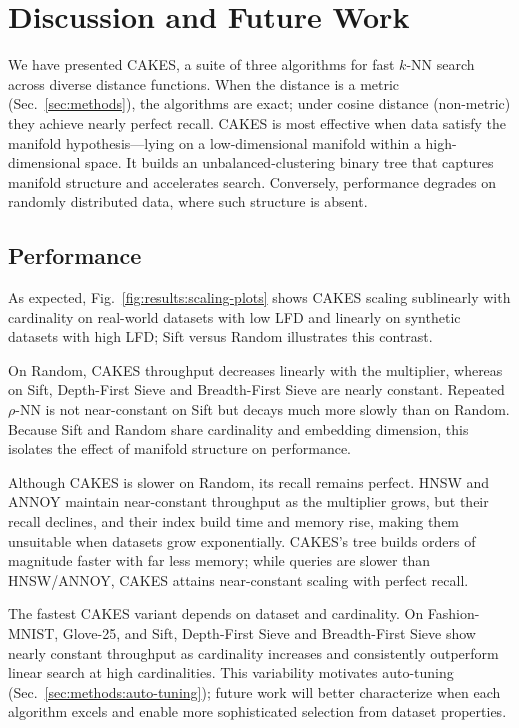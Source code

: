 \section{Discussion and Future Work}
\label{sec:discussion-and-future-work}

We have presented CAKES, a suite of three algorithms for fast $k$-NN search across diverse distance functions. When the distance is a metric (Sec.~\ref{sec:methods}), the algorithms are exact; under cosine distance (non-metric) they achieve nearly perfect recall. CAKES is most effective when data satisfy the manifold hypothesis—lying on a low-dimensional manifold within a high-dimensional space. It builds an unbalanced-clustering binary tree that captures manifold structure and accelerates search. Conversely, performance degrades on randomly distributed data, where such structure is absent.


\subsection{Performance}

As expected, Fig.~\ref{fig:results:scaling-plots} shows CAKES scaling sublinearly with cardinality on real-world datasets with low LFD and linearly on synthetic datasets with high LFD; Sift versus Random illustrates this contrast.

On Random, CAKES throughput decreases linearly with the multiplier, whereas on Sift, Depth-First Sieve and Breadth-First Sieve are nearly constant. Repeated $\rho$-NN is not near-constant on Sift but decays much more slowly than on Random. Because Sift and Random share cardinality and embedding dimension, this isolates the effect of manifold structure on performance.

Although CAKES is slower on Random, its recall remains perfect. HNSW and ANNOY maintain near-constant throughput as the multiplier grows, but their recall declines, and their index build time and memory rise, making them unsuitable when datasets grow exponentially. CAKES’s tree builds orders of magnitude faster with far less memory; while queries are slower than HNSW/ANNOY, CAKES attains near-constant scaling with perfect recall.

The fastest CAKES variant depends on dataset and cardinality. On Fashion-MNIST, Glove-25, and Sift, Depth-First Sieve and Breadth-First Sieve show nearly constant throughput as cardinality increases and consistently outperform linear search at high cardinalities. This variability motivates auto-tuning (Sec.~\ref{sec:methods:auto-tuning}); future work will better characterize when each algorithm excels and enable more sophisticated selection from dataset properties.

